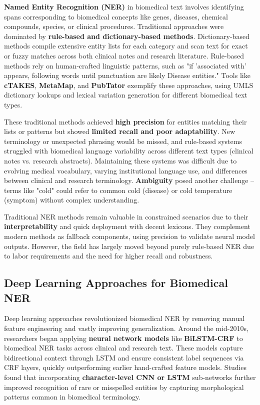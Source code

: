\textbf{Named Entity Recognition (NER)} in biomedical text involves identifying spans corresponding to biomedical concepts like genes, diseases, chemical compounds, species, or clinical procedures. Traditional approaches were dominated by \textbf{rule-based and dictionary-based methods}. Dictionary-based methods compile extensive entity lists for each category and scan text for exact or fuzzy matches across both clinical notes and research literature. Rule-based methods rely on human-crafted linguistic patterns, such as "if 'associated with' appears, following words until punctuation are likely Disease entities." Tools like \textbf{cTAKES}, \textbf{MetaMap}, and \textbf{PubTator} exemplify these approaches, using UMLS dictionary lookups and lexical variation generation for different biomedical text types.

These traditional methods achieved \textbf{high precision} for entities matching their lists or patterns but showed \textbf{limited recall and poor adaptability}. New terminology or unexpected phrasing would be missed, and rule-based systems struggled with biomedical language variability across different text types (clinical notes vs. research abstracts). Maintaining these systems was difficult due to evolving medical vocabulary, varying institutional language use, and differences between clinical and research terminology. \textbf{Ambiguity} posed another challenge – terms like "cold" could refer to common cold (disease) or cold temperature (symptom) without complex understanding.

Traditional NER methods remain valuable in constrained scenarios due to their \textbf{interpretability} and quick deployment with decent lexicons. They complement modern methods as fallback components, using precision to validate neural model outputs. However, the field has largely moved beyond purely rule-based NER due to labor requirements and the need for higher recall and robustness.

\subsection{Deep Learning Approaches for Biomedical NER}

Deep learning approaches revolutionized biomedical NER by removing manual feature engineering and vastly improving generalization. Around the mid-2010s, researchers began applying \textbf{neural network models} like \textbf{BiLSTM-CRF} to biomedical NER tasks across clinical and research text. These models capture bidirectional context through LSTM and ensure consistent label sequences via CRF layers, quickly outperforming earlier hand-crafted feature models. Studies found that incorporating \textbf{character-level CNN or LSTM} sub-networks further improved recognition of rare or misspelled entities by capturing morphological patterns common in biomedical terminology.

